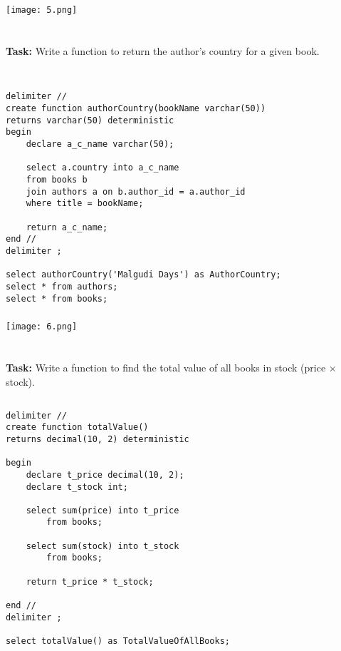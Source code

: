 \documentclass[12pt,a4paper]{article}
\begin{document}
\subsubsection{}
\begin{center}
    \texttt{[image: 5.png]}
\end{center}


\section{}
\textbf{Task:} Write a function to return the author's country for a given book.

\subsection{}
\begin{lstlisting}

delimiter //
create function authorCountry(bookName varchar(50))
returns varchar(50) deterministic
begin
	declare a_c_name varchar(50);
    
    select a.country into a_c_name
    from books b 
    join authors a on b.author_id = a.author_id
    where title = bookName;
    
    return a_c_name;
end //
delimiter ;

select authorCountry('Malgudi Days') as AuthorCountry;
select * from authors;
select * from books;
\end{lstlisting}

\subsubsection{}
\begin{center}
    \texttt{[image: 6.png]}
\end{center}


\section{}
\textbf{Task:} Write a function to find the total value of all books in stock (price × stock).

\subsection{}
\begin{lstlisting}
delimiter //
create function totalValue()
returns decimal(10, 2) deterministic

begin
	declare t_price decimal(10, 2);
    declare t_stock int;
    
    select sum(price) into t_price
        from books;
        
	select sum(stock) into t_stock
        from books;
        
	return t_price * t_stock;
        
end //
delimiter ;

select totalValue() as TotalValueOfAllBooks;
\end{lstlisting}
\end{document}
